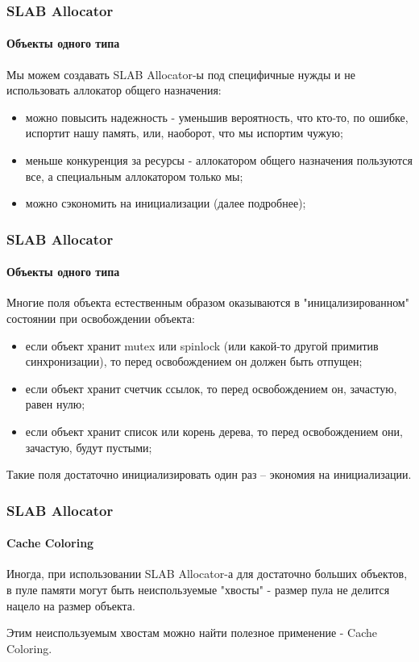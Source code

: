 \begin{frame}
\frametitle{SLAB Allocator}
\framesubtitle{Объекты одного типа}

Мы можем создавать SLAB Allocator-ы под специфичные нужды и не использовать аллокатор общего назначения:
\begin{itemize}
  \item можно повысить надежность - уменьшив вероятность, что кто-то, по ошибке, испортит нашу память, или, наоборот, что мы испортим чужую;
  \item меньше конкуренция за ресурсы - аллокатором общего назначения пользуются все, а специальным аллокатором только мы;
  \item можно сэкономить на инициализации (далее подробнее);
\end{itemize}
\end{frame}

\begin{frame}
\frametitle{SLAB Allocator}
\framesubtitle{Объекты одного типа}

Многие поля объекта естественным образом оказываются в "иницализированном" состоянии при освобождении объекта:

\begin{itemize}
  \item если объект хранит mutex или spinlock (или какой-то другой примитив синхронизации), то перед освобождением он должен быть отпущен;
  \item если объект хранит счетчик ссылок, то перед освобождением он, зачастую, равен нулю;
  \item если объект хранит список или корень дерева, то перед освобождением они, зачастую, будут пустыми;
\end{itemize}

Такие поля достаточно инициализировать один раз -- экономия на инициализации.

\end{frame}

\begin{frame}
\frametitle{SLAB Allocator}
\framesubtitle{Cache Coloring}

Иногда, при использовании SLAB Allocator-а для достаточно больших объектов, в пуле памяти могут быть неиспользуемые "хвосты" - размер пула не делится нацело на размер объекта.

Этим неиспользуемым хвостам можно найти полезное применение - Cache Coloring.

\end{frame}

